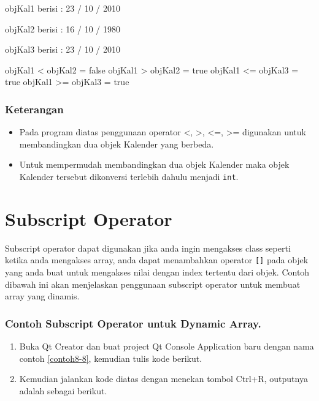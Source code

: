 \begin{lcverbatim}
objKal1 berisi :
23 / 10 / 2010

objKal2 berisi :
16 / 10 / 1980

objKal3 berisi :
23 / 10 / 2010

objKal1 < objKal2 = false
objKal1 > objKal2 = true
objKal1 <= objKal3 = true
objKal1 >= objKal3 = true
\end{lcverbatim}

\subsubsection*{Keterangan}

\begin{itemize}

\item
  Pada program diatas penggunaan operator \textless{}, \textgreater{},
  \textless{}=, \textgreater{}= digunakan untuk membandingkan dua objek
  Kalender yang berbeda.
\item
  Untuk mempermudah membandingkan dua objek Kalender maka objek Kalender
  tersebut dikonversi terlebih dahulu menjadi \texttt{int}.
\end{itemize}

\section{Subscript Operator}\label{subscript-operator}

Subscript operator dapat digunakan jika anda ingin mengakses class
seperti ketika anda mengakses array, anda dapat menambahkan operator
\texttt{{[}{]}} pada objek yang anda buat untuk mengakses nilai dengan
index tertentu dari objek. Contoh dibawah ini akan menjelaskan
penggunaan subscript operator untuk membuat array yang dinamis.

\subsubsection*{Contoh  Subscript Operator untuk Dynamic Array.}

\begin{enumerate}

\item
  Buka Qt Creator dan buat project Qt Console Application baru dengan
  nama contoh \ref{contoh8-8}, kemudian tulis kode berikut.




\item
  Kemudian jalankan kode diatas dengan menekan tombol Ctrl+R, outputnya
  adalah sebagai berikut.
\end{enumerate}

